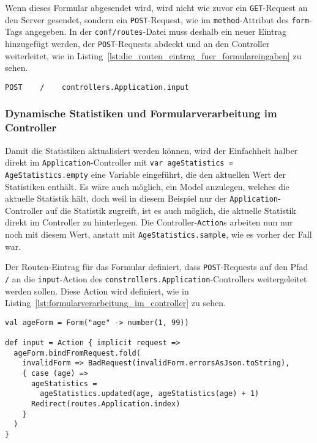Wenn dieses Formular abgesendet wird, wird nicht wie zuvor ein \lstinline|GET|-Request an den Server gesendet, sondern ein \lstinline|POST|-Request, wie im \lstinline|method|-Attribut des \lstinline|form|-Tags angegeben.
In der \lstinline|conf/routes|-Datei muss deshalb ein neuer Eintrag hinzugefügt werden, der \lstinline|POST|-Requests abdeckt und an den Controller weiterleitet, wie in Listing~\ref{lst:die_routen_eintrag_fuer_formulareingaben} zu sehen.

\begin{lstlisting}[caption=Die Routen-Eintrag für Formulareingaben, label=lst:die_routen_eintrag_fuer_formulareingaben]
POST    /    controllers.Application.input
\end{lstlisting}


\subsubsection{Dynamische Statistiken und Formularverarbeitung im Controller} %
\label{ssub:formularverarbeitung_im_controller}

Damit die Statistiken aktualisiert werden können, wird der Einfachheit halber direkt im \lstinline|Application|-Controller mit \lstinline|var ageStatistics = AgeStatistics.empty| eine Variable eingeführt, die den aktuellen Wert der Statistiken enthält.
Es wäre auch möglich, ein Model anzulegen, welches die aktuelle Statistik hält, doch weil in diesem Beispiel nur der \lstinline|Application|-Controller auf die Statistik zugreift, ist es auch möglich, die aktuelle Statistik direkt im Controller zu hinterlegen.
Die Controller-\lstinline|Action|s arbeiten nun nur noch mit diesem Wert, anstatt mit \lstinline|AgeStatistics.sample|, wie es vorher der Fall war.

Der Routen-Eintrag für das Formular definiert, dass \lstinline|POST|-Requests auf den Pfad \lstinline|/| an die \lstinline|input|-Action des \lstinline|constrollers.Application|-Controllers weitergeleitet werden sollen.
Diese Action wird definiert, wie in Listing~\ref{lst:formularverarbeitung_im_controller} zu sehen.

\begin{lstlisting}[caption=Formularverarbeitung im Controller, label=lst:formularverarbeitung_im_controller]
val ageForm = Form("age" -> number(1, 99))

def input = Action { implicit request =>
  ageForm.bindFromRequest.fold(
    invalidForm => BadRequest(invalidForm.errorsAsJson.toString),
    { case (age) =>
      ageStatistics =
        ageStatistics.updated(age, ageStatistics(age) + 1)
      Redirect(routes.Application.index)
    }
  )
}
\end{lstlisting}

